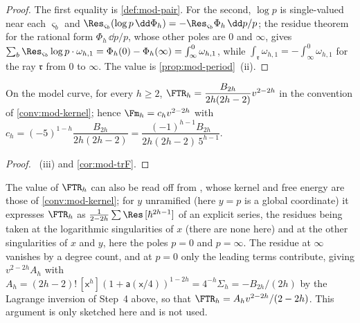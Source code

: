 \begin{proof}
The first equality is \cref{def:mod-pair}. For the second, $\log p$ is single-valued near each $\varsigma_b$ and $\Res_{\varsigma_b}(\log p\,\dd\Phi_h)=-\Res_{\varsigma_b}\Phi_h\,\dd p/p$; the residue theorem for the rational form $\Phi_h\,\dd p/p$, whose other poles are $0$ and $\infty$, gives $\sum_b\Res_{\varsigma_b}\log p\cdot\omega_{h,1}=\Phi_h(0)-\Phi_h(\infty)=\int_\infty^0\omega_{h,1}$, while $\int_{\mathfrak r}\omega_{h,1}=-\int_\infty^0\omega_{h,1}$ for the ray $\mathfrak r$ from $0$ to $\infty$. The value is \cref{prop:mod-period}~(ii).
\end{proof}

\begin{thm}
\label{thm:mod-gap}
On the model curve, for every $h\geq 2$, $\FTR_h=\dfrac{B_{2h}}{2h(2h-2)}v^{2-2h}$ in the convention of \cref{conv:mod-kernel}; hence $\Fm_h=c_hv^{2-2h}$ with $c_h=(-5)^{1-h}\dfrac{B_{2h}}{2h(2h-2)}=\dfrac{(-1)^{h-1}B_{2h}}{2h(2h-2)\,5^{h-1}}$.
\end{thm}

\begin{proof}
~(iii) and \cref{cor:mod-trF}.
\end{proof}

\begin{rmk}
\label{rmk:mod-hock}
The value of $\FTR_h$ can also be read off from \cite[Cor.~1.2, (1.3)]{Hock25}, whose kernel and free energy \cite[(2.1), (1.1)]{Hock25} are those of \cref{conv:mod-kernel}; for $y$ unramified (here $y=p$ is a global coordinate) it expresses $\FTR_h$ as $\frac{1}{2-2h}\sum\Res\,[\hbar^{2h-1}]$ of an explicit series, the residues being taken at the logarithmic singularities of $x$ (there are none here) and at the other singularities of $x$ and $y$, here the poles $p=0$ and $p=\infty$. The residue at $\infty$ vanishes by a degree count, and at $p=0$ only the leading terms contribute, giving $v^{2-2h}A_h$ with $A_h=(2h-2)!\,[\mathsf x^h](1+\mathsf a(\mathsf x/4))^{1-2h}=4^{-h}\Sigma_h=-B_{2h}/(2h)$ by the Lagrange inversion of Step~4 above, so that $\FTR_h=A_hv^{2-2h}/(2-2h)$. This argument is only sketched here and is not used. 
\end{rmk}


